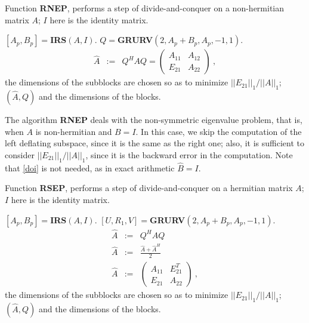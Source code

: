 \documentclass{article}
\theoremstyle{definition}
\begin{document}
\begin{algorithm}[ht!]
\protect\caption{Function \textbf{RNEP}, performs a step of divide-and-conquer on a non-hermitian matrix $A$; $I$ here is the identity matrix.}
\begin{algorithmic}[1]
\label{rnep}
\STATE $[A_p, B_p] = $\textbf{IRS}$(A,I)$.
\STATE $Q = $\textbf{GRURV}$(2, A_p+B_p, A_p, -1, 1)$.
\STATE \begin{eqnarray*} \label{trei} \hat{A} &:=& Q^{H} A Q = \left ( \begin{array}{cc} A_{11} & A_{12} \\ E_{21} & A_{22} \end{array} \right )~,
\end{eqnarray*}
the dimensions of the subblocks are chosen so as to minimize $||E_{21}||_1/||A||_1$;
\RETURN $(\hat{A}, Q)$ and the dimensions of the blocks.
\end{algorithmic}
\end{algorithm}

\vspace{.35cm}

The algorithm \textbf{RNEP} deals with the non-symmetric eigenvalue problem, 
that is, when $A$ is non-hermitian and $B = I$. In this case, we skip the 
computation of the left deflating subspace, since it is the same as the right one; 
also, it is sufficient to consider $||E_{21}||_1 / ||A||_1$, since it is the 
backward error in the computation. 
Note that \eqref{doi} is not needed, as in exact arithmetic $\hat{B} = I$.

\begin{algorithm}[ht!]
\protect\caption{Function \textbf{RSEP}, performs a step of divide-and-conquer on a hermitian matrix $A$; $I$ here is the identity matrix.}
\begin{algorithmic}[1]
\label{rsep}
\STATE $[A_p, B_p] = $\textbf{IRS}$(A,I)$.
\STATE $[U, R_1, V] = $\textbf{GRURV}$(2, A_p+B_p, A_p, -1, 1)$.
\STATE \begin{eqnarray*} \label{five} \hat{A} &:=& Q^{H} A Q \\
\label{six} \hat{A} & := & \frac{\hat{A}+\hat{A}^{H}}{2} \\
\label{seven} \hat{A} & := & \left ( \begin{array}{cc} A_{11} & E_{21}^{T} \\ E_{21} & A_{22} \end{array} \right )~,
\end{eqnarray*}
the dimensions of the subblocks are chosen so as to minimize $||E_{21}||_1/||A||_1$;
\RETURN $(\hat{A}, Q)$ and the dimensions of the blocks.
\end{algorithmic}
\end{algorithm}
\end{document}
